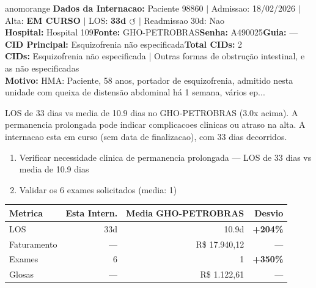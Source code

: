\documentclass[a4paper,10pt]{article}
\begin{document}
\begin{anomalycard}[Internacao 165960 | GHO-PETROBRAS | ALTO (z=3.99)]{anomorange}
\textbf{Dados da Internacao:} Paciente 98860 $\mid$ Admissao: 18/02/2026 $\mid$ Alta: \textcolor{anomorange}{\textbf{EM CURSO}} $\mid$ LOS: \textbf{33d \textcolor{anomorange}{$\circlearrowleft$}} $\mid$ Readmissao 30d: Nao\\
\textbf{Hospital:} Hospital 109\quad\textbf{Fonte:} GHO-PETROBRAS\quad\textbf{Senha:} A490025\quad\textbf{Guia:} ---\\
\textbf{CID Principal:} {\small Esquizofrenia não especificada}\quad\textbf{Total CIDs:} 2\\

\textbf{CIDs:} {\scriptsize Esquizofrenia não especificada | Outras formas de obstrução intestinal, e as não especificadas}\\

\textbf{Motivo:} {\scriptsize HMA: Paciente, 58 anos, portador de esquizofrenia, admitido nesta unidade com queixa de distensão abdominal há 1 semana, vários ep...}\\

\vspace{2pt}\begin{tcolorbox}[colback=severityred!20,colframe=anomorange,title={\textbf{Interpretacao de Negocio}},fonttitle=\bfseries\small,left=4pt,right=4pt,top=3pt,bottom=3pt]
{\small LOS de 33 dias vs media de 10.9 dias no GHO-PETROBRAS (3.0x acima). A permanencia prolongada pode indicar complicacoes clinicas ou atraso na alta. A internacao esta em curso (sem data de finalizacao), com 33 dias decorridos.}
\end{tcolorbox}
\begin{tcolorbox}[colback=severityyellow!30,colframe=anomorange,title={\textbf{Recomendacoes Especificas}},fonttitle=\bfseries\small,left=4pt,right=4pt,top=3pt,bottom=3pt]
\begin{enumerate}[nosep,leftmargin=16pt]
\item {\small Verificar necessidade clinica de permanencia prolongada --- LOS de 33 dias vs media de 10.9 dias}
\item {\small Validar os 6 exames solicitados (media: 1)}
\end{enumerate}
\end{tcolorbox}
\begin{center}\begin{tabular}{l r r r}\toprule\textbf{Metrica} & \textbf{Esta Intern.} & \textbf{Media GHO-PETROBRAS} & \textbf{Desvio} \\\midrule
LOS & 33d & 10.9d & \textcolor{anomred}{\textbf{+204\%}} \\
Faturamento & --- & R\$ 17.940,12 & --- \\
Exames & 6 & 1 & \textcolor{anomred}{\textbf{+350\%}} \\
Glosas & --- & R\$ 1.122,61 & --- \\
\bottomrule\end{tabular}\end{center}


\end{anomalycard}
\end{document}
